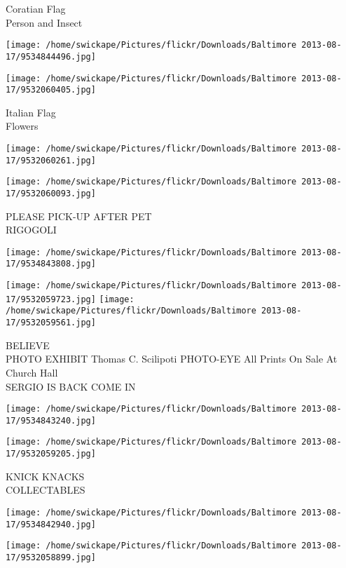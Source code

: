 \documentclass[10pt,letterpaper]{article}
\begin{document}
Coratian Flag\\
Person and Insect
\pagebreak

\texttt{[image: /home/swickape/Pictures/flickr/Downloads/Baltimore 2013-08-17/9534844496.jpg]}

\vspace{0.25in}
\texttt{[image: /home/swickape/Pictures/flickr/Downloads/Baltimore 2013-08-17/9532060405.jpg]}

Italian Flag\\
Flowers
\pagebreak

\texttt{[image: /home/swickape/Pictures/flickr/Downloads/Baltimore 2013-08-17/9532060261.jpg]}

\vspace{0.25in}
\texttt{[image: /home/swickape/Pictures/flickr/Downloads/Baltimore 2013-08-17/9532060093.jpg]}

PLEASE PICK{-}UP AFTER PET\\
RIGOGOLI
\pagebreak

\texttt{[image: /home/swickape/Pictures/flickr/Downloads/Baltimore 2013-08-17/9534843808.jpg]}

\vspace{0.25in}
\texttt{[image: /home/swickape/Pictures/flickr/Downloads/Baltimore 2013-08-17/9532059723.jpg]}
\texttt{[image: /home/swickape/Pictures/flickr/Downloads/Baltimore 2013-08-17/9532059561.jpg]}

BELIEVE\\
PHOTO EXHIBIT Thomas C. Scilipoti PHOTO{-}EYE All Prints On Sale At Church Hall\\
SERGIO IS BACK COME IN
\pagebreak

\texttt{[image: /home/swickape/Pictures/flickr/Downloads/Baltimore 2013-08-17/9534843240.jpg]}

\vspace{0.25in}
\texttt{[image: /home/swickape/Pictures/flickr/Downloads/Baltimore 2013-08-17/9532059205.jpg]}

KNICK KNACKS\\
COLLECTABLES
\pagebreak

\texttt{[image: /home/swickape/Pictures/flickr/Downloads/Baltimore 2013-08-17/9534842940.jpg]}

\vspace{0.25in}
\texttt{[image: /home/swickape/Pictures/flickr/Downloads/Baltimore 2013-08-17/9532058899.jpg]}
\end{document}
